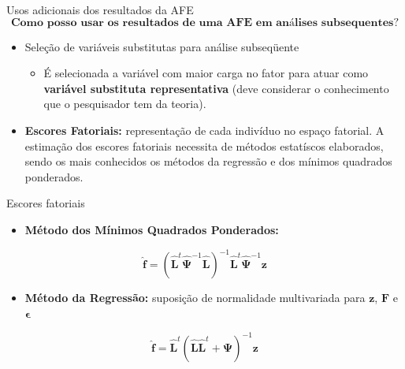 \documentclass[
  ignorenonframetext,
  aspectratio=169,
]{beamer}
\providecommand{\tightlist}{%
  \setlength{\itemsep}{0pt}\setlength{\parskip}{0pt}}
\begin{document}
\begin{frame}{Usos adicionais dos resultados da AFE}
\label{usos-adicionais-dos-resultados-da-afe}
\[\textbf{Como posso usar os resultados de uma AFE em análises subsequentes?}\]

\begin{itemize}
\tightlist
\item
  Seleção de variáveis substitutas para análise subseqüente

  \begin{itemize}
  \tightlist
  \item
    É selecionada a variável com maior carga no fator para atuar como
    \textbf{variável substituta representativa} (deve considerar o
    conhecimento que o pesquisador tem da teoria).
  \end{itemize}
\end{itemize}

\vspace{0.3cm}

\pause

\begin{itemize}
\tightlist
\item
  \textbf{Escores Fatoriais:} representação de cada indivíduo no espaço
  fatorial. A estimação dos escores fatoriais necessita de métodos
  estatíscos elaborados, sendo os mais conhecidos os métodos da
  regressão e dos mínimos quadrados ponderados.
\end{itemize}
\end{frame}

\begin{frame}{Escores fatoriais}
\label{escores-fatoriais}
\begin{itemize}
\tightlist
\item
  \textbf{Método dos Mínimos Quadrados Ponderados:}
\end{itemize}

\[\hat{\boldsymbol{f}} = ( \hat{\boldsymbol{L}}^t \hat{\boldsymbol{\Psi}}^{-1} \hat{\boldsymbol{L}})^{-1}  \hat{\boldsymbol{L}}^t \hat{\boldsymbol{\Psi}}^{-1} \boldsymbol{z}\]

\bigskip

\pause

\begin{itemize}
\tightlist
\item
  \textbf{Método da Regressão:} suposição de normalidade multivariada
  para \(\boldsymbol{z}\), \(\boldsymbol{F}\) e
  \(\boldsymbol{\epsilon}\)
\end{itemize}

\[\hat{\boldsymbol{f}} = \hat{\boldsymbol{L}}^t (\hat{\boldsymbol{L}} \hat{\boldsymbol{L}}^t + \hat{\boldsymbol{\Psi}})^{-1}\boldsymbol{z}\]
\end{frame}
\end{document}
